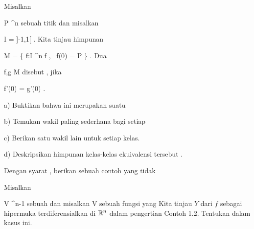 {}
{

Misalkan

\mavergleichskette
{\vergleichskette
{ P
}
{ \in }{ \R^n
}
{  }{
}
{    }{
}
{   }{
}
}
{}{}{}
sebuah titik dan misalkan

\mavergleichskette
{\vergleichskette
{ I
}
{ = }{ {]{-1},1[}
}
{  }{
}
{    }{
}
{   }{
}
}
{}{}{.}
Kita tinjau himpunan

\mavergleichskettedisp
{\vergleichskette
{ M
}
{ =} { \left\{ f:I \rightarrow \R^n   \mid  f  , \,  f(0) = P       \right\}
}
{ } {
}
{ } {
}
{ } {
}
}
{}{}{.}
Dua

\mavergleichskette
{\vergleichskette
{ f,g
}
{ \in }{ M
}
{  }{
}
{    }{
}
{   }{
}
}
{}{}{}
disebut  {,} jika

\mavergleichskettedisp
{\vergleichskette
{ f'(0)
}
{ =} { g'(0)
}
{ } {
}
{ } {
}
{ } {
}
}
{}{}{.}

a) Buktikan bahwa ini merupakan suatu

b) Temukan wakil paling sederhana bagi setiap

c) Berikan satu wakil lain untuk setiap kelas.

d) Deskripsikan himpunan kelas-kelas ekuivalensi tersebut
 {} {.}

}
{} {}

{}
{

Dengan syarat
 {} {,}
berikan sebuah contoh
yang tidak

}
{} {}

{}
{

Misalkan

\mavergleichskette
{\vergleichskette
{ V
}
{ \subseteq }{ \R^{n-1}
}
{  }{
}
{    }{
}
{   }{
}
}
{}{}{}
sebuah
dan misalkan
 { V } {\R
} {}
sebuah fungsi yang
Kita tinjau
$Y$ dari $f$ sebagai hipermuka terdiferensialkan di ${\mathbb R}^n$ dalam pengertian
Contoh 1.2.
Tentukan
dalam kasus ini.

}
{} {}

